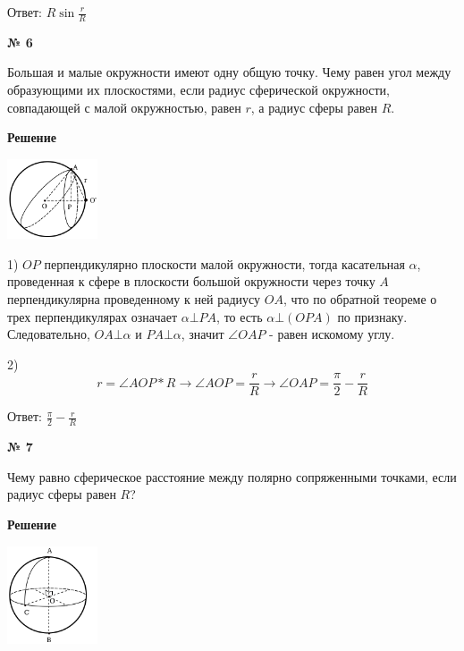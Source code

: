     Ответ: $R\sin \frac{r}{R}$


    \begin{center}
        \textbf{№ 6}
    \end{center}

    Большая и малые окружности имеют одну общую точку.
    Чему равен угол между образующими их плоскостями, если радиус сферической окружности,
    совпадающей с малой окружностью, равен $r$, а радиус сферы равен $R$.

    \textbf{Решение}\\

    \begin{center}
        \includegraphics[width=0.2\textwidth]{images/img12}\\
    \end{center}

    1) $OP$ перпендикулярно плоскости малой окружности, тогда касательная $\alpha$, проведенная к сфере
    в плоскости большой окружности через точку $A$ перпендикулярна проведенному к ней радиусу $OA$,
    что по обратной теореме о трех перпендикулярах означает $\alpha \bot PA$, то есть $\alpha \bot (OPA)$ по признаку.
    Следовательно, $OA \bot \alpha$ и $PA \bot \alpha$, значит $\angle OAP$ - равен искомому углу.

    2)
    \[
        r = \angle AOP * R \rightarrow \angle AOP = \frac{r}{R} \rightarrow \angle OAP = \frac{\pi}{2} - \frac{r}{R}
    \]

    Ответ: $\frac{\pi}{2} - \frac{r}{R}$

    \begin{center}
        \textbf{№ 7}
    \end{center}

    Чему равно сферическое расстояние между полярно сопряженными точками, если радиус сферы равен $R$?

     \textbf{Решение}\\

    \begin{center}
        \includegraphics[width=0.2\textwidth]{images/img13}\\
    \end{center}

